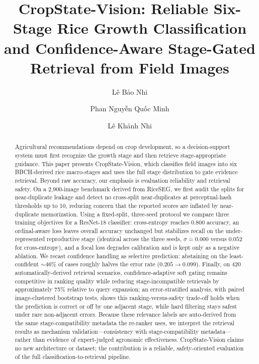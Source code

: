 \documentclass{llncs}
\begin{document}
\title{CropState-Vision: Reliable Six-Stage Rice Growth
Classification and Confidence-Aware Stage-Gated Retrieval from Field Images}

\author{Lê Bảo Nhi \and Phan Nguyễn Quốc Minh \and Lê Khánh Nhi}


\maketitle

\begin{abstract}
Agricultural recommendations depend on crop development, so a decision-support system must first recognize the growth stage and then retrieve stage-appropriate guidance. This paper presents CropState-Vision, which classifies field images into six BBCH-derived rice macro-stages and uses the full stage distribution to gate evidence retrieval. Beyond raw accuracy, our emphasis is evaluation reliability and retrieval safety. On a 2{,}900-image benchmark derived from RiceSEG, we first audit the splits for near-duplicate leakage and detect no cross-split near-duplicates at perceptual-hash thresholds up to 10, reducing concern that the reported scores are inflated by near-duplicate memorization. Using a fixed-split, three-seed protocol we compare three training objectives for a ResNet-18 classifier: cross-entropy reaches 0.800 accuracy, an ordinal-aware loss leaves overall accuracy unchanged but stabilizes recall on the under-represented reproductive stage (identical across the three seeds, $\sigma=0.000$ versus $0.052$ for cross-entropy), and a focal loss degrades calibration and is kept only as a negative ablation. We recast confidence handling as selective prediction: abstaining on the least-confident ${\sim}46\%$ of cases roughly halves the error rate ($0.205\to0.099$). Finally, on 420 automatically-derived retrieval scenarios, confidence-adaptive soft gating remains competitive in ranking quality while reducing stage-incompatible retrievals by approximately 75\% relative to query expansion; an error-stratified analysis, with paired image-clustered bootstrap tests, shows this ranking-versus-safety trade-off holds when the prediction is correct or off by one adjacent stage, while hard filtering stays safest under rare non-adjacent errors. Because these relevance labels are auto-derived from the same stage-compatibility metadata the re-ranker uses, we interpret the retrieval results as mechanism validation---consistency with stage-compatibility metadata---rather than evidence of expert-judged agronomic effectiveness. CropState-Vision claims no new architecture or dataset; the contribution is a reliable, safety-oriented evaluation of the full classification-to-retrieval pipeline.

\end{abstract}
\end{document}
